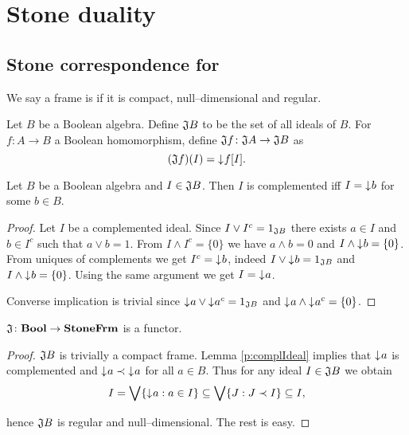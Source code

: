 \chapter{Stone duality}
\section{Stone correspondence for \StoneFrm}
\begin{definition}
    We say a frame is  if it is compact, null--dimensional and regular.
\end{definition}

\begin{definition}
    Let $B$ be a Boolean algebra. Define $\DEFSYM{J}{\J} B$ to be the set of all ideals of $B$.
    For $f\colon A \to B$ a Boolean homomorphism, define $\mathfrak{J} f\colon \mathfrak{J} A \to \mathfrak{J} B$ as
    $$(\mathfrak{J} f)(I) = \mathord{\downarrow}\mkern1mu f[I].$$
\end{definition}

\begin{lemma}\label{p:complIdeal}
    Let $B$ be a Boolean algebra and $I \in \mathfrak{J} B$. Then $I$ is complemented iff $I = \mathord{\downarrow}\mkern1mu b$ for some $b \in B$.
\end{lemma}
\begin{proof}
    Let $I$ be a complemented ideal. Since $I \vee I^c = 1_{\mathfrak{J} B}$ there exists $a \in I$ and $b \in I^c$ such that $a \vee b = 1$. From $I \wedge I^c = \{0\}$ we have $a \wedge b = 0$ and $I \wedge \mathord{\downarrow}\mkern1mu b = \{0\}$.
    From uniques of complements we get $I^c = \mathord{\downarrow}\mkern1mu b$, indeed $I \vee \mathord{\downarrow}\mkern1mu b = 1_{\mathfrak{J} B}$ and $I \wedge \mathord{\downarrow}\mkern1mu b = \{0\}$. Using the same argument we get $I = \mathord{\downarrow}\mkern1mu a$.

    Converse implication is trivial since $\mathord{\downarrow}\mkern1mu a \vee \mathord{\downarrow}\mkern1mu a^c = 1_{\mathfrak{J} B}$ and $\mathord{\downarrow}\mkern1mu a \wedge \mathord{\downarrow}\mkern1mu a^c = \{0\}$.
\end{proof}

\begin{proposition}\label{p:JisFunctor}
    $\mathfrak{J}\colon \mathbf{Bool} \to \mathbf{StoneFrm}$ is a functor.
\end{proposition}
\begin{proof}
    $\mathfrak{J} B$ is trivially a compact frame. Lemma \ref{p:complIdeal} implies that $\mathord{\downarrow}\mkern1mu a$ is complemented and $\mathord{\downarrow}\mkern1mu a \prec \mathord{\downarrow}\mkern1mu a$ for all $a \in B$. Thus for any ideal $I \in \mathfrak{J} B$ we obtain
    $$ I = \bigvee \{ \mathord{\downarrow}\mkern1mu a : a \in I \} \subseteq \bigvee \{ J : J \prec I \} \subseteq I,$$

\noindent hence $\mathfrak{J} B$ is regular and null--dimensional. The rest is easy.
\end{proof}

